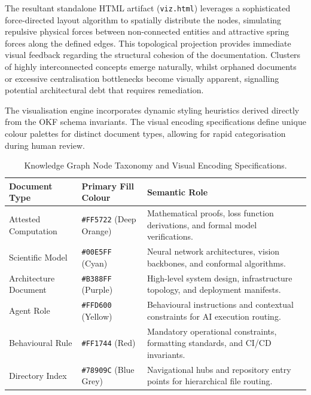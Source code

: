 The resultant standalone HTML artifact (\texttt{viz.html}) leverages a sophisticated force-directed layout algorithm to spatially distribute the nodes, simulating repulsive physical forces between non-connected entities and attractive spring forces along the defined edges. This topological projection provides immediate visual feedback regarding the structural cohesion of the documentation. Clusters of highly interconnected concepts emerge naturally, whilst orphaned documents or excessive centralisation bottlenecks become visually apparent, signalling potential architectural debt that requires remediation.

The visualisation engine incorporates dynamic styling heuristics derived directly from the OKF schema invariants. The visual encoding specifications define unique colour palettes for distinct document types, allowing for rapid categorisation during human review.

\begin{table}[htbp]
    \centering
    \caption{Knowledge Graph Node Taxonomy and Visual Encoding Specifications.}
    \label{tab:knowledge_graph_styling}
    \begin{tabularx}{\textwidth}{l l X}
        \toprule
        \textbf{Document Type} & \textbf{Primary Fill Colour} & \textbf{Semantic Role} \\
        \midrule
        Attested Computation & \texttt{\#FF5722} (Deep Orange) & Mathematical proofs, loss function derivations, and formal model verifications. \\
        Scientific Model & \texttt{\#00E5FF} (Cyan) & Neural network architectures, vision backbones, and conformal algorithms. \\
        Architecture Document & \texttt{\#B388FF} (Purple) & High-level system design, infrastructure topology, and deployment manifests. \\
        Agent Role & \texttt{\#FFD600} (Yellow) & Behavioural instructions and contextual constraints for AI execution routing. \\
        Behavioural Rule & \texttt{\#FF1744} (Red) & Mandatory operational constraints, formatting standards, and CI/CD invariants. \\
        Directory Index & \texttt{\#78909C} (Blue Grey) & Navigational hubs and repository entry points for hierarchical file routing. \\
        \bottomrule
    \end{tabularx}
\end{table}

